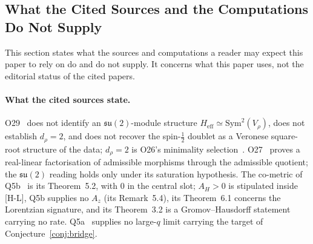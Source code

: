 \documentclass[11pt,a4paper]{article}
\newcommand{\Heff}{H_{\mathrm{eff}}}
\newcommand{\su}{\mathfrak{su}}
\newcommand{\Vr}{V_\rho}
\newcommand{\Sym}{\mathrm{Sym}}
\begin{document}
  \subsection{What the Cited Sources and the Computations Do Not Supply}
    \label{ssec:withdrawn}

    This section states what the sources and computations a reader may expect this paper to rely on
    do and do not supply.
    It concerns what this paper uses, not the editorial status of the cited papers.

    \paragraph{What the cited sources state.}
      O29~\cite{Beau2026a33} does not identify an $\su(2)$-module structure
      $\Heff \simeq \Sym^2(\Vr)$,
      does not establish $d_\rho = 2$, and does not recover the spin-$\tfrac12$ doublet as a
      Veronese square-root structure of the data; $d_\rho = 2$ is O26's minimality
      selection~\cite{Beau2026a30}.
      O27~\cite{Beau2026a31} proves a real-linear factorisation of admissible morphisms through the
      admissible quotient; the $\su(2)$ reading holds only under its saturation hypothesis.
      The co-metric of Q5b~\cite{Beau2026q5b} is its Theorem~5.2, with $0$ in the central slot;
      $A_H > 0$ is stipulated inside [H-L], Q5b supplies no $A_z$ (its Remark~5.4), its Theorem~6.1
      concerns the Lorentzian signature, and its Theorem~3.2 is a Gromov--Hausdorff statement
      carrying no rate.
      Q5a~\cite{Beau2026q5a} supplies no large-$q$ limit carrying the target of
      Conjecture~\ref{conj:bridge}.
\end{document}
